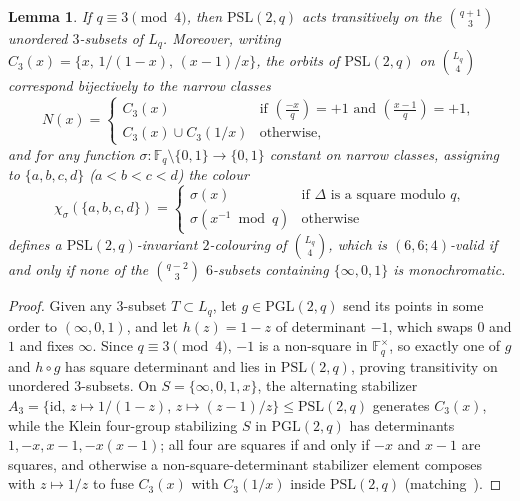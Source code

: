\documentclass[11pt]{article}
\newtheorem{lemma}[theorem]{Lemma}
\theoremstyle{remark}
\newcommand{\F}{\mathbb{F}}
\begin{document}
\begin{lemma}\label{lem:3hom}
If $q\equiv 3\pmod 4$, then $\mathrm{PSL}(2,q)$ acts transitively on the
$\binom{q+1}{3}$ unordered $3$-subsets of $L_q$. Moreover, writing $C_3(x)=\{x,\,1/(1-x),\,(x-1)/x\}$, the orbits of
$\mathrm{PSL}(2,q)$ on $\binom{L_q}{4}$ correspond bijectively to the narrow
classes
\[
  N(x)=\begin{cases}
    C_3(x) & \text{if } \left(\frac{-x}{q}\right)=+1 \text{ and } \left(\frac{x-1}{q}\right)=+1,\\[6pt]
    C_3(x)\cup C_3(1/x) & \text{otherwise,}
  \end{cases}
\]
and for any function $\sigma\colon\F_q\setminus\{0,1\}\to\{0,1\}$ constant on
narrow classes, assigning to $\{a,b,c,d\}$ ($a<b<c<d$) the colour
\begin{equation}\label{eq:col}
  \chi_\sigma(\{a,b,c,d\})=\begin{cases}
    \sigma(x) & \text{if $\Delta$ is a square modulo $q$,}\\
    \sigma(x^{-1}\bmod q) & \text{otherwise}
  \end{cases}
\end{equation}
defines a $\mathrm{PSL}(2,q)$-invariant $2$-colouring of $\binom{L_q}{4}$,
which is $(6,6;4)$-valid if and only if none of the $\binom{q-2}{3}$
$6$-subsets containing $\{\infty,0,1\}$ is monochromatic.
\end{lemma}

\begin{proof}
Given any $3$-subset $T\subset L_q$, let $g\in\mathrm{PGL}(2,q)$ send its
points in some order to $(\infty,0,1)$, and let $h(z)=1-z$ of determinant $-1$,
which swaps $0$ and $1$ and fixes $\infty$. Since $q\equiv 3\pmod 4$, $-1$ is a
non-square in $\F_q^\times$, so exactly one of $g$ and $h\circ g$ has square
determinant and lies in $\mathrm{PSL}(2,q)$, proving transitivity on unordered
$3$-subsets. On $S=\{\infty,0,1,x\}$, the alternating stabilizer
$A_3=\{\mathrm{id},\,z\mapsto 1/(1-z),\,z\mapsto(z-1)/z\}\le\mathrm{PSL}(2,q)$
generates $C_3(x)$, while the Klein four-group stabilizing $S$ in
$\mathrm{PGL}(2,q)$ has determinants $1,-x,x-1,-x(x-1)$; all four are squares if
and only if $-x$ and $x-1$ are squares, and otherwise a non-square-determinant
stabilizer element composes with $z\mapsto 1/z$ to fuse $C_3(x)$ with
$C_3(1/x)$ inside $\mathrm{PSL}(2,q)$ (matching~\cite[Lemma~4]{lysenstoen}).
\end{proof}
\end{document}
